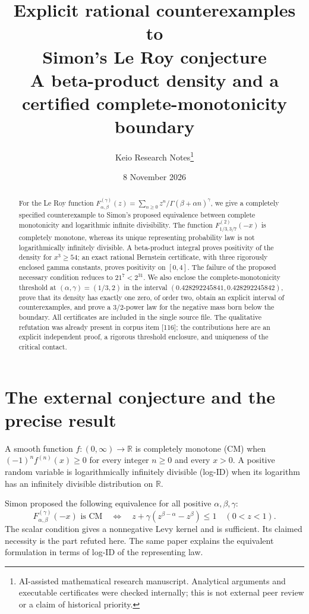 \documentclass[11pt,a4paper]{article}
\title{Explicit rational counterexamples to\\Simon’s Le Roy conjecture\\[6pt]
\large A beta-product density and a certified complete-monotonicity boundary}
\author{Keio Research Notes\thanks{AI-assisted mathematical research manuscript.
Analytical arguments and executable certificates were checked internally;
this is not external peer review or a claim of historical priority.}}
\date{8 November 2026}
\numberwithin{equation}{section}
\theoremstyle{definition}\newtheorem{definition}[theorem]{Definition}
\theoremstyle{remark}\newtheorem{remark}[theorem]{Remark}
\newcommand{\R}{\mathbb R}
\begin{document}
\maketitle
\begin{abstract}
For the Le Roy function
\(F_{\alpha,\beta}^{(\gamma)}(z)=\sum_{n\ge0}z^n/\Gamma(\beta+\alpha n)^\gamma\),
we give a completely specified counterexample to Simon's proposed
equivalence between complete monotonicity and logarithmic infinite
divisibility. The function \(F_{1/3,3/7}^{(2)}(-x)\) is completely
monotone, whereas its unique representing probability law is not
logarithmically infinitely divisible. A beta-product integral proves
positivity of the density for \(x^3\ge54\); an exact rational
Bernstein certificate, with three rigorously enclosed gamma constants,
proves positivity on \([0,4]\). The failure of the proposed necessary
condition reduces to \(21^7<2^{31}\).
We also enclose the complete-monotonicity threshold at
\((\alpha,\gamma)=(1/3,2)\) in the interval
\((0.428292245841,0.428292245842)\), prove that its density has
exactly one zero, of order two, obtain an explicit interval of
counterexamples, and prove a \(3/2\)-power law for the negative mass
born below the boundary. All certificates are included in the single source
file. The qualitative refutation was already present in corpus item
[116]; the contributions here are an explicit independent proof,
a rigorous threshold enclosure, and uniqueness of the critical contact.
\end{abstract}

\section{The external conjecture and the precise result}

A smooth function \(f:(0,\infty)\to\R\) is completely monotone
(CM) when \((-1)^n f^{(n)}(x)\ge0\) for every integer \(n\ge0\)
and every \(x>0\). A positive random variable is logarithmically
infinitely divisible (log-ID) when its logarithm has an infinitely
divisible distribution on \(\R\).

Simon \cite[Section 3]{Simon} proposed the following equivalence for
all positive \(\alpha,\beta,\gamma\):
\begin{equation}\label{eq:external}
 F_{\alpha,\beta}^{(\gamma)}(-x)\text{ is CM}
 \quad\Longleftrightarrow\quad
 z+\gamma(z^{\beta-\alpha}-z^\beta)\le1
 \quad(0<z<1).
\end{equation}
The scalar condition gives a nonnegative Levy kernel and is sufficient.
Its claimed necessity is the part refuted here. The same paper explains
the equivalent formulation in terms of log-ID of the representing law.
\end{document}
